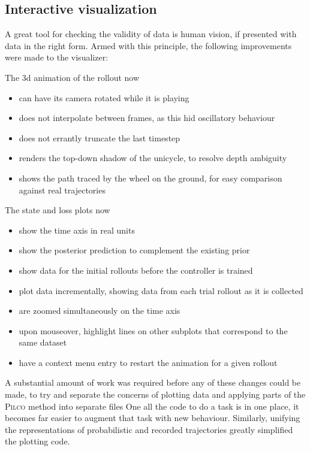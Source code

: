 \documentclass[main.tex]{subfiles}
\begin{document}
\subsection{Interactive visualization}

A great tool for checking the validity of data is human vision, if presented with data in the right form.
Armed with this principle, the following improvements were made to the visualizer:
\begin{multicols}{2}
	\raggedcolumns
	\noindent
	The 3d animation of the rollout now
	\begin{itemize}[nosep]
		\item can have its camera rotated while it is playing
		\item does not interpolate between frames, as this hid oscillatory behaviour
		\item does not errantly truncate the last timestep
		\item renders the top-down shadow of the unicycle, to resolve depth ambiguity
		\item shows the path traced by the wheel on the ground, for easy comparison against real trajectories
	\end{itemize}
	\columnbreak
	\noindent
	The state and loss plots now
	\begin{itemize}[nosep]
		\item show the time axis in real units
		\item show the posterior prediction to complement the existing prior
		\item show data for the initial rollouts before the controller is trained
		\item plot data incrementally, showing data from each trial rollout as it is collected
		\item are zoomed simultaneously on the time axis
		\item upon mouseover, highlight lines on other subplots that correspond to the same dataset
		\item have a context menu entry to restart the animation for a given rollout
	\end{itemize}
\end{multicols}

A substantial amount of work was required before any of these changes could be made, to try and separate the concerns of plotting data and applying parts of the \textsc{Pilco} method into separate files
One all the code to do a task is in one place, it becomes far easier to augment that task with new behaviour.
Similarly, unifying the representations of probabilistic and recorded trajectories greatly simplified the plotting code.
\end{document}
